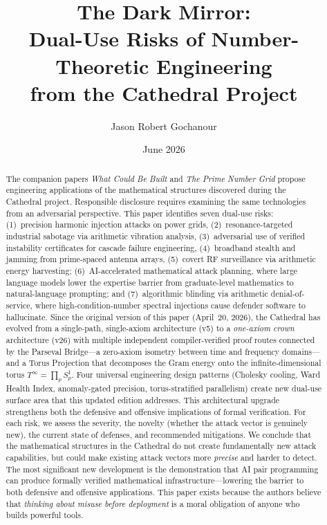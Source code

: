 \documentclass[11pt,a4paper]{article}
\title{%
  The Dark Mirror:\\
  Dual-Use Risks of Number-Theoretic Engineering\\
  from the Cathedral Project%
}
\author{
  Jason Robert Gochanour
}
\date{June 2026}
\begin{document}
\maketitle

\begin{abstract}
The companion papers \emph{What Could Be Built} and \emph{The
Prime Number Grid} propose engineering applications of the
mathematical structures discovered during the Cathedral project.
Responsible disclosure requires examining the same technologies
from an adversarial perspective. This paper identifies seven
dual-use risks: (1)~precision harmonic injection attacks on power
grids, (2)~resonance-targeted industrial sabotage via arithmetic
vibration analysis, (3)~adversarial use of verified instability
certificates for cascade failure engineering, (4)~broadband stealth
and jamming from prime-spaced antenna arrays, (5)~covert RF
surveillance via arithmetic energy harvesting;
(6)~AI-accelerated mathematical attack planning, where large
language models lower the expertise barrier from graduate-level
mathematics to natural-language prompting; and
(7)~algorithmic blinding via arithmetic denial-of-service,
where high-condition-number spectral injections cause
defender software to hallucinate.
Since the original version of this paper (April~20, 2026),
the Cathedral has evolved from a single-path, single-axiom
architecture (v5) to a \emph{one-axiom crown} architecture (v26) with
multiple independent compiler-verified proof routes connected by the
Parseval Bridge---a zero-axiom isometry between time and frequency
domains---and a Torus Projection that decomposes the Gram energy onto
the infinite-dimensional torus $T^\infty = \prod_p S^1_p$.
Four universal engineering design patterns (Cholesky cooling,
Ward Health Index, anomaly-gated precision, torus-stratified
parallelism) create new dual-use surface area that this
updated edition addresses.
This architectural upgrade strengthens both the defensive
and offensive implications of formal verification.
For each risk, we
assess the severity, the novelty (whether the attack vector is
genuinely new), the current state of defenses, and recommended
mitigations. We conclude that the mathematical structures in the
Cathedral do not create fundamentally new attack capabilities, but
could make existing attack vectors more \emph{precise} and harder
to detect. The most significant new development is the
demonstration that AI pair programming can produce formally verified
mathematical infrastructure---lowering the barrier to both
defensive and offensive applications.
This paper exists because the authors believe
that \emph{thinking about misuse before deployment} is a moral
obligation of anyone who builds powerful tools.
\end{abstract}
\end{document}
